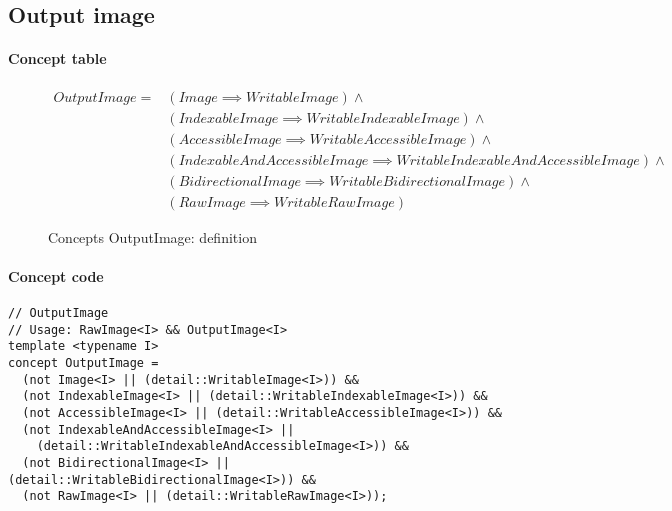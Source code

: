 \clearpage

\subsection{Output image}

\paragraph{Concept table}

\begin{figure}[!htbp]
  \begin{scriptsize}
    \begin{equation}
      \begin{aligned}
        OutputImage ={} & (Image \implies WritableImage) \wedge                                             \\
                        & (IndexableImage \implies WritableIndexableImage) \wedge                           \\
                        & (AccessibleImage \implies WritableAccessibleImage) \wedge                         \\
                        & (IndexableAndAccessibleImage \implies WritableIndexableAndAccessibleImage) \wedge \\
                        & (BidirectionalImage \implies WritableBidirectionalImage) \wedge                   \\
                        & (RawImage \implies WritableRawImage)
      \end{aligned}
    \end{equation}
    \smallskip

    \caption{Concepts OutputImage: definition}
  \end{scriptsize}
  \label{table:concept.image.expressions.8}
\end{figure}

\paragraph{Concept code}

\begin{verbatim}
// OutputImage
// Usage: RawImage<I> && OutputImage<I>
template <typename I>
concept OutputImage =
  (not Image<I> || (detail::WritableImage<I>)) &&
  (not IndexableImage<I> || (detail::WritableIndexableImage<I>)) &&
  (not AccessibleImage<I> || (detail::WritableAccessibleImage<I>)) &&
  (not IndexableAndAccessibleImage<I> ||
    (detail::WritableIndexableAndAccessibleImage<I>)) &&
  (not BidirectionalImage<I> || (detail::WritableBidirectionalImage<I>)) &&
  (not RawImage<I> || (detail::WritableRawImage<I>));
\end{verbatim}
